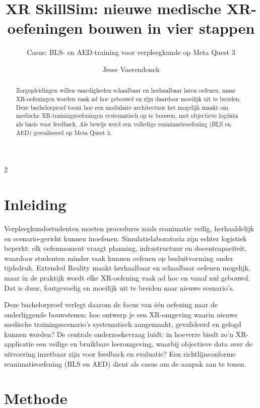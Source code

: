 \documentclass[a0,portrait]{hogent-poster}
\title{XR SkillSim: nieuwe medische XR-oefeningen bouwen in vier stappen}
\subtitle{Casus: BLS- en AED-training voor verpleegkunde op Meta Quest 3}
\author{Jesse Vaerendonck}
\begin{document}
\maketitle

\begin{abstract}
Zorgopleidingen willen vaardigheden schaalbaar en herhaalbaar laten oefenen, maar XR-oefeningen worden vaak ad hoc gebouwd en zijn daardoor moeilijk uit te breiden. Deze bachelorproef toont hoe een modulaire architectuur het mogelijk maakt om medische XR-trainingsoefeningen systematisch op te bouwen, met objectieve logdata als basis voor feedback. Als bewijs werd een volledige reanimatieoefening (BLS en AED) gerealiseerd op Meta Quest 3.
\end{abstract}

\begin{multicols}{2} %

\section{Inleiding}

Verpleegkundestudenten moeten procedures zoals reanimatie veilig, herhaaldelijk en scenario-gericht kunnen inoefenen. Simulatielaboratoria zijn echter logistiek beperkt: elk oefenmoment vraagt planning, infrastructuur en docentcapaciteit, waardoor studenten minder vaak kunnen oefenen op besluitvorming onder tijdsdruk. Extended Reality maakt herhaalbaar en schaalbaar oefenen mogelijk, maar in de praktijk wordt elke XR-oefening vaak ad hoc en vanaf nul gebouwd. Dat is duur, foutgevoelig en moeilijk uit te breiden naar nieuwe scenario's.

Deze bachelorproef verlegt daarom de focus van één oefening naar de onderliggende bouwstenen: hoe ontwerp je een XR-omgeving waarin nieuwe medische trainingsscenario's systematisch aangemaakt, gevalideerd en gelogd kunnen worden? De centrale onderzoeksvraag luidt: in hoeverre biedt zo'n XR-applicatie een veilige en bruikbare leeromgeving, waarbij objectieve data over de uitvoering inzetbaar zijn voor feedback en evaluatie? Een richtlijnconforme reanimatieoefening (BLS en AED) dient als casus om de aanpak aan te tonen.

\section{Methode}


\end{multicols}
\end{document}
